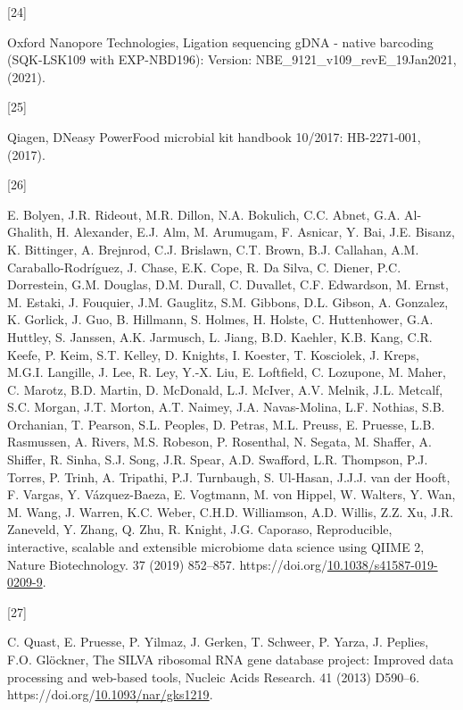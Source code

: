 \documentclass[preprint,3p,
a4paper]{elsarticle} %
\newlength{\cslhangindent}
\newlength{\csllabelwidth}
\newlength{\cslentryspacingunit} %
\newenvironment{CSLReferences}[2] %
 {%
  \setlength{\parindent}{0pt}
  \ifodd #1
  \let\oldpar\par
  \def\par{\hangindent=\cslhangindent\oldpar}
  \fi
  \setlength{\parskip}{#2\cslentryspacingunit}
 }%
 {}
\newcommand{\CSLLeftMargin}[1]{\parbox[t]{\csllabelwidth}{#1}}
\newcommand{\CSLRightInline}[1]{\parbox[t]{\linewidth - \csllabelwidth}{#1}\break}
\begin{document}
\begin{CSLReferences}{0}{0}
\leavevmode{}%
\CSLLeftMargin{{[}24{]} }%
\CSLRightInline{Oxford Nanopore Technologies, Ligation sequencing gDNA -
native barcoding (SQK-LSK109 with EXP-NBD196): Version:
NBE{\_}9121{\_}v109{\_}revE{\_}19Jan2021, (2021).}

\leavevmode{}%
\CSLLeftMargin{{[}25{]} }%
\CSLRightInline{Qiagen, DNeasy PowerFood microbial kit handbook 10/2017:
HB-2271-001, (2017).}

\leavevmode{}%
\CSLLeftMargin{{[}26{]} }%
\CSLRightInline{E. Bolyen, J.R. Rideout, M.R. Dillon, N.A. Bokulich,
C.C. Abnet, G.A. Al-Ghalith, H. Alexander, E.J. Alm, M. Arumugam, F.
Asnicar, Y. Bai, J.E. Bisanz, K. Bittinger, A. Brejnrod, C.J. Brislawn,
C.T. Brown, B.J. Callahan, A.M. Caraballo-Rodríguez, J. Chase, E.K.
Cope, R. Da Silva, C. Diener, P.C. Dorrestein, G.M. Douglas, D.M.
Durall, C. Duvallet, C.F. Edwardson, M. Ernst, M. Estaki, J. Fouquier,
J.M. Gauglitz, S.M. Gibbons, D.L. Gibson, A. Gonzalez, K. Gorlick, J.
Guo, B. Hillmann, S. Holmes, H. Holste, C. Huttenhower, G.A. Huttley, S.
Janssen, A.K. Jarmusch, L. Jiang, B.D. Kaehler, K.B. Kang, C.R. Keefe,
P. Keim, S.T. Kelley, D. Knights, I. Koester, T. Kosciolek, J. Kreps,
M.G.I. Langille, J. Lee, R. Ley, Y.-X. Liu, E. Loftfield, C. Lozupone,
M. Maher, C. Marotz, B.D. Martin, D. McDonald, L.J. McIver, A.V. Melnik,
J.L. Metcalf, S.C. Morgan, J.T. Morton, A.T. Naimey, J.A. Navas-Molina,
L.F. Nothias, S.B. Orchanian, T. Pearson, S.L. Peoples, D. Petras, M.L.
Preuss, E. Pruesse, L.B. Rasmussen, A. Rivers, M.S. Robeson, P.
Rosenthal, N. Segata, M. Shaffer, A. Shiffer, R. Sinha, S.J. Song, J.R.
Spear, A.D. Swafford, L.R. Thompson, P.J. Torres, P. Trinh, A. Tripathi,
P.J. Turnbaugh, S. Ul-Hasan, J.J.J. van der Hooft, F. Vargas, Y.
Vázquez-Baeza, E. Vogtmann, M. von Hippel, W. Walters, Y. Wan, M. Wang,
J. Warren, K.C. Weber, C.H.D. Williamson, A.D. Willis, Z.Z. Xu, J.R.
Zaneveld, Y. Zhang, Q. Zhu, R. Knight, J.G. Caporaso, Reproducible,
interactive, scalable and extensible microbiome data science using QIIME
2, Nature Biotechnology. 37 (2019) 852--857.
https://doi.org/\href{https://doi.org/10.1038/s41587-019-0209-9}{10.1038/s41587-019-0209-9}.}

\leavevmode{}%
\CSLLeftMargin{{[}27{]} }%
\CSLRightInline{C. Quast, E. Pruesse, P. Yilmaz, J. Gerken, T. Schweer,
P. Yarza, J. Peplies, F.O. Glöckner, The SILVA ribosomal RNA gene
database project: Improved data processing and web-based tools, Nucleic
Acids Research. 41 (2013) D590--6.
https://doi.org/\href{https://doi.org/10.1093/nar/gks1219}{10.1093/nar/gks1219}.}


\end{CSLReferences}
\end{document}
